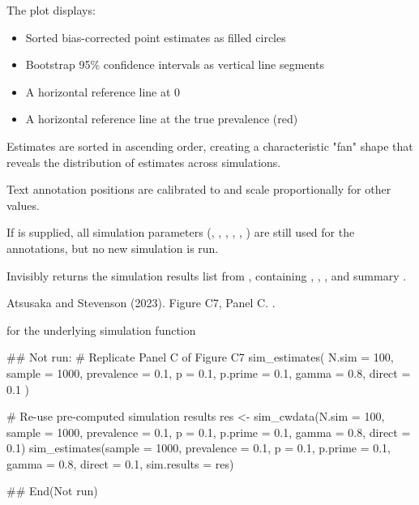 \documentclass[a4paper]{book}
\begin{document}
\begin{Details}
The plot displays:
\begin{itemize}

\item{} Sorted bias-corrected point estimates as filled circles
\item{} Bootstrap 95\% confidence intervals as vertical line segments
\item{} A horizontal reference line at 0
\item{} A horizontal reference line at the true prevalence  (red)

\end{itemize}

Estimates are sorted in ascending order, creating a characteristic
"fan" shape that reveals the distribution of estimates across simulations.

Text annotation positions are calibrated to  and scale
proportionally for other values.

If  is supplied, all simulation parameters (,
, , , , ) are
still used for the annotations, but no new simulation is run.
\end{Details}
%
\begin{Value}
Invisibly returns the simulation results list from ,
containing , ,
, and summary .
\end{Value}
%
\begin{References}
Atsusaka and Stevenson (2023). Figure C7, Panel C.
.
\end{References}
%
\begin{SeeAlso}
 for the underlying simulation function
\end{SeeAlso}
%
\begin{Examples}
\begin{ExampleCode}
## Not run: 
# Replicate Panel C of Figure C7
sim_estimates(
  N.sim   = 100,
  sample  = 1000,
  prevalence = 0.1,
  p       = 0.1,
  p.prime = 0.1,
  gamma   = 0.8,
  direct  = 0.1
)

# Re-use pre-computed simulation results
res <- sim_cwdata(N.sim = 100, sample = 1000, prevalence = 0.1,
                  p = 0.1, p.prime = 0.1, gamma = 0.8, direct = 0.1)
sim_estimates(sample = 1000, prevalence = 0.1, p = 0.1, p.prime = 0.1,
              gamma = 0.8, direct = 0.1, sim.results = res)

## End(Not run)

\end{ExampleCode}
\end{Examples}
\end{document}
